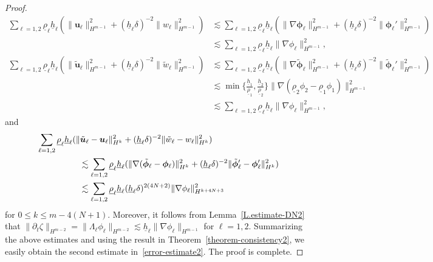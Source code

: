\documentclass[11pt,leqno]{article}
\numberwithin{equation}{section}
\numberwithin{figure}{section}
\begin{document}
\begin{proof}
%
\begin{align*}
\sum_{\ell=1,2} \underline{\rho}_\ell \underline{h}_\ell
 (\|\bm{u}_\ell\|_{H^{m-1}}^2 + (\underline{h}_\ell\delta)^{-2}\|w_\ell\|_{H^{m-1}}^2 )
&\lesssim \sum_{\ell=1,2} \underline{\rho}_\ell \underline{h}_\ell
 (\|\nabla\bm{\phi}_\ell\|_{H^{m-1}}^2 + (\underline{h}_\ell\delta)^{-2}\|\bm{\phi}_\ell'\|_{H^{m-1}}^2) \\
&\lesssim \sum_{\ell=1,2} \underline{\rho}_\ell \underline{h}_\ell \|\nabla\phi_\ell\|_{H^{m-1}}^2,
\end{align*}
%
\begin{align*}
\sum_{\ell=1,2} \underline{\rho}_\ell \underline{h}_\ell
 (\|\tilde{\bm{u}}_\ell\|_{H^{m-1}}^2 + (\underline{h}_\ell\delta)^{-2}\|\tilde{w}_\ell\|_{H^{m-1}}^2 )
&\lesssim \sum_{\ell=1,2} \underline{\rho}_\ell \underline{h}_\ell
 (\|\nabla\tilde{\bm{\phi}}_\ell\|_{H^{m-1}}^2 + (\underline{h}_\ell\delta)^{-2}\|\tilde{\bm{\phi}}_\ell'\|_{H^{m-1}}^2) \\
&\lesssim \min\biggl\{\frac{\underline{h}_1}{\underline{\rho}_1},\frac{\underline{h}_2}{\underline{\rho}_2} \biggr\}
  \|\nabla(\underline{\rho}_2\phi_2-\underline{\rho}_1\phi_1)\|_{H^{m-1}}^2 \\
&\lesssim \sum_{\ell=1,2} \underline{\rho}_\ell \underline{h}_\ell \|\nabla\phi_\ell\|_{H^{m-1}}^2,
\end{align*}
%
and
%
\begin{align*}
&\sum_{\ell=1,2} \underline{\rho}_\ell \underline{h}_\ell
 (\|\tilde{\bm{u}}_\ell-\bm{u}_\ell\|_{H^k}^2 + (\underline{h}_\ell\delta)^{-2}\|\tilde{w}_\ell-w_\ell\|_{H^k}^2 ) \\
&\makebox[5em]{}
\lesssim \sum_{\ell=1,2} \underline{\rho}_\ell \underline{h}_\ell
 (\|\nabla(\tilde{\bm{\phi}}_\ell-\bm{\phi}_\ell)\|_{H^k}^2
  + (\underline{h}_\ell\delta)^{-2}\|\tilde{\bm{\phi}}_\ell'-\bm{\phi}_\ell'\|_{H^k}^2) \\
&\makebox[5em]{}
\lesssim \sum_{\ell=1,2} \underline{\rho}_\ell \underline{h}_\ell (\underline{h}_\ell\delta)^{2(4N+2)}\|\nabla\phi_\ell\|_{H^{k+4N+3}}^2
\end{align*}
%
for $0\leq k\leq m-4(N+1)$. 
Moreover, it follows from Lemma~\ref{L.estimate-DN2} that 
$\|\partial_t\zeta\|_{H^{m-2}} = \|\Lambda_\ell\phi_\ell\|_{H^{m-2}}
 \lesssim \underline{h}_\ell \|\nabla\phi_\ell\|_{H^{m-1}}$ for $\ell=1,2$. 
Summarizing the above estimates and using the result in Theorem~\ref{theorem-consistency2}, 
we easily obtain the second estimate in~\eqref{error-estimate2}. 
The proof is complete. 
\end{proof}
\end{document}
